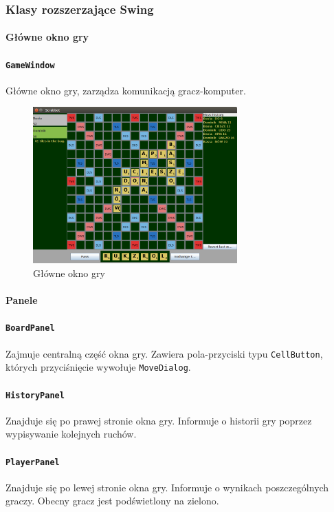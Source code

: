 \documentclass[a4paper]{article}
\begin{document}
\newpage
\subsubsection{Klasy rozszerzające Swing}
\paragraph{Główne okno gry}
\paragraph{\texttt{GameWindow}} Główne okno gry, zarządza komunikacją gracz-komputer.

\begin{figure}[!ht]
\centering
\includegraphics[width=0.7\textwidth]{1.png}
\caption{Główne okno gry}

\end{figure}
\paragraph{Panele}
\paragraph{\texttt{BoardPanel}} Zajmuje centralną część okna gry. Zawiera pola-przyciski typu \texttt{CellButton}, których przyciśnięcie wywołuje \texttt{MoveDialog}.
\paragraph{\texttt{HistoryPanel}} Znajduje się po prawej stronie okna gry. Informuje o historii gry poprzez wypisywanie kolejnych ruchów.
\paragraph{\texttt{PlayerPanel}} Znajduje się po lewej stronie okna gry. Informuje o wynikach poszczególnych graczy. Obecny gracz jest podświetlony na zielono.
\end{document}
